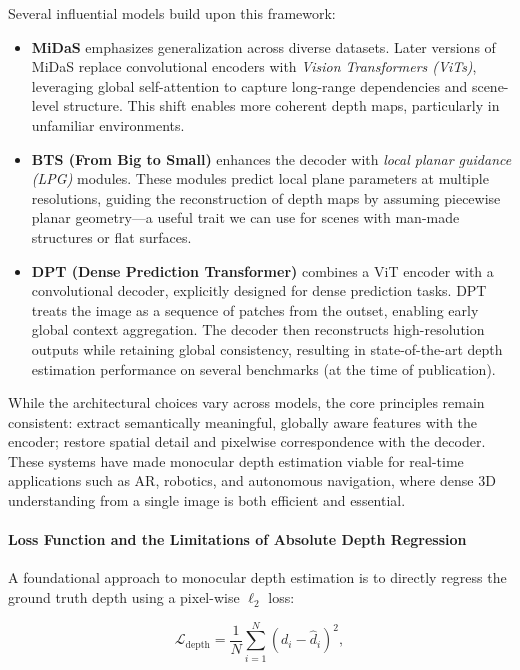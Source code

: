 Several influential models build upon this framework:

\begin{itemize}
    \item \textbf{MiDaS} \cite{ranftl2022_midas} emphasizes generalization across diverse datasets. Later versions of MiDaS replace convolutional encoders with \emph{Vision Transformers (ViTs)}, leveraging global self-attention to capture long-range dependencies and scene-level structure. This shift enables more coherent depth maps, particularly in unfamiliar environments.
    
    \item \textbf{BTS (From Big to Small)} \cite{lee2019_bts} enhances the decoder with \emph{local planar guidance (LPG)} modules. These modules predict local plane parameters at multiple resolutions, guiding the reconstruction of depth maps by assuming piecewise planar geometry—a useful trait we can use for scenes with man-made structures or flat surfaces.
    
    \item \textbf{DPT (Dense Prediction Transformer)} \cite{ranftl2021_dpt} combines a ViT encoder with a convolutional decoder, explicitly designed for dense prediction tasks. DPT treats the image as a sequence of patches from the outset, enabling early global context aggregation. The decoder then reconstructs high-resolution outputs while retaining global consistency, resulting in state-of-the-art depth estimation performance on several benchmarks (at the time of publication).
\end{itemize}

While the architectural choices vary across models, the core principles remain consistent: extract semantically meaningful, globally aware features with the encoder; restore spatial detail and pixelwise correspondence with the decoder. These systems have made monocular depth estimation viable for real-time applications such as AR, robotics, and autonomous navigation, where dense 3D understanding from a single image is both efficient and essential.

\paragraph{Loss Function and the Limitations of Absolute Depth Regression}
A foundational approach to monocular depth estimation is to directly regress the ground truth depth using a pixel-wise $\ell_2$ loss:

\[
\mathcal{L}_{\text{depth}} = \frac{1}{N} \sum_{i=1}^{N} \left( d_i - \hat{d}_i \right)^2,
\]

